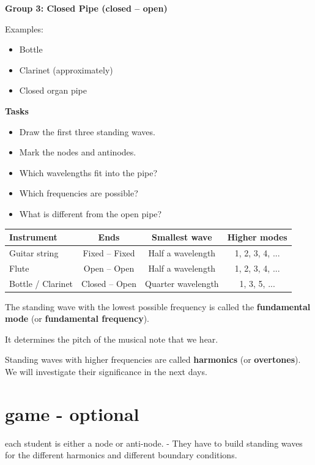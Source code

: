 \documentclass[a4paper,11pt]{article}
\begin{document}
\textbf{Group 3: Closed Pipe (closed -- open)}

Examples:
\begin{itemize}
    \item Bottle
    \item Clarinet (approximately)
    \item Closed organ pipe
\end{itemize}

\textbf{Tasks}

\begin{itemize}
    \item Draw the first three standing waves.
    \item Mark the nodes and antinodes.
    \item Which wavelengths fit into the pipe?
    \item Which frequencies are possible?
    \item What is different from the open pipe?
\end{itemize}


\begin{table}[h]
\centering
\renewcommand{\arraystretch}{1.5}
\begin{tabular}{|l|c|c|c|}
\hline
\textbf{Instrument} & \textbf{Ends} & \textbf{Smallest wave} & \textbf{Higher modes} \\
\hline
Guitar string &
Fixed -- Fixed &
Half a wavelength &
1, 2, 3, 4, ...
\\
\hline
Flute &
Open -- Open &
Half a wavelength &
1, 2, 3, 4, ...
\\
\hline
Bottle / Clarinet &
Closed -- Open &
Quarter wavelength &
1, 3, 5, ...
\\
\hline
\end{tabular}
\end{table}


The standing wave with the lowest possible frequency is called the
\textbf{fundamental mode} (or \textbf{fundamental frequency}).

It determines the pitch of the musical note that we hear.

Standing waves with higher frequencies are called
\textbf{harmonics} (or \textbf{overtones}). We will investigate their  significance  in the next days. 


\section{game - optional}
each student is either a node or anti-node. - They have to build standing waves for the  different harmonics and different boundary conditions. 
 
\end{document}
